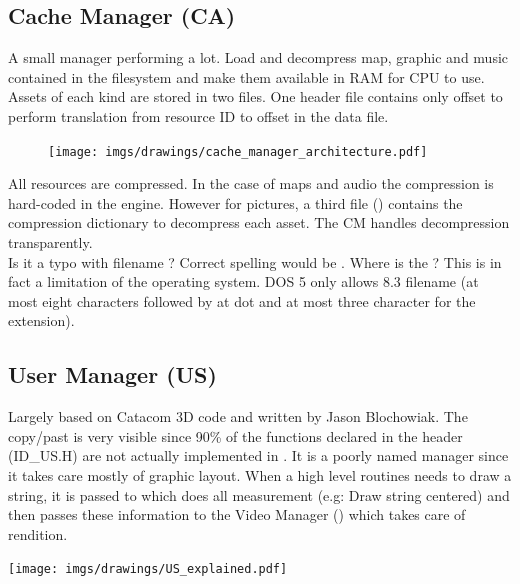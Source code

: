 \documentclass[book.tex]{subfiles}
\begin{document}
\subsection{Cache Manager (CA)}
A small manager performing a lot. Load and decompress map, graphic and music contained in the filesystem and make them available in RAM for CPU to use. Assets of each kind are stored in two files. One header file contains only offset to perform translation from resource ID to offset in the data file.\\
 \par
\begin{figure}[H]
\centering
 \texttt{[image: imgs/drawings/cache\_manager\_architecture.pdf]}
 \end{figure}
 \par
{} All resources are compressed. In the case of maps and audio the compression is hard-coded in the engine. However for pictures, a third file () contains the compression dictionary to decompress each asset. The CM handles decompression transparently.\\
 Is it a typo with filename  ? Correct spelling would be . Where is the ? This is in fact a limitation of the operating system. DOS 5 only allows 8.3 filename (at most eight characters followed by at dot and at most three character for the extension).








\subsection{User Manager (US)}
\begin{minipage}{0.7\textwidth}
Largely based on Catacom 3D code and written by Jason Blochowiak. The copy/past is very visible since 90\% of the functions declared in the header (ID\_US.H) are not actually implemented in . 
It is a poorly named manager since it takes care mostly of graphic layout. When a  high level routines needs to draw a string, it is passed to  which does all measurement (e.g: Draw string centered)
and then passes these information to the Video Manager () which takes care of rendition.
\end{minipage}
\begin{minipage}{0.3\textwidth}
\begin{flushright}
\texttt{[image: imgs/drawings/US\_explained.pdf]}
\end{flushright}
\end{minipage}
\noindent
\\
\end{document}
